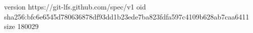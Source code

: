 version https://git-lfs.github.com/spec/v1
oid sha256:bfc6e6545d780636878df93dd1b23ede7ba823fdfa597c4109b628ab7caa6411
size 180029
